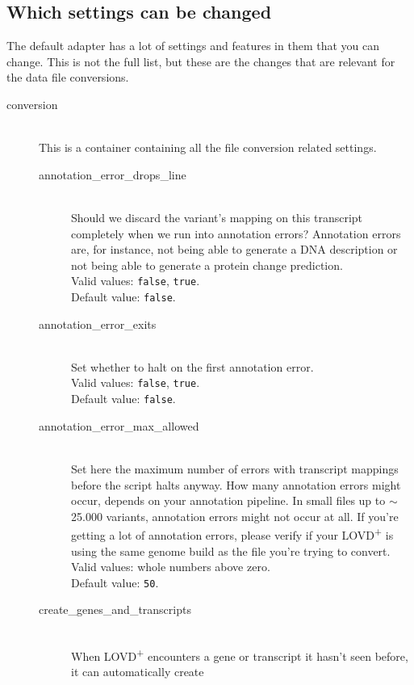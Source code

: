\subsection{Which settings can be changed}
\label{ssec:adapters_which_settings}
The default adapter has a lot of settings and features in them that you can change.
This is not the full list, but these are the changes that are relevant for the data file conversions.

\begin{description}
  \item[conversion] \hfill \\
    This is a container containing all the file conversion related settings.
  \begin{description}
    \item[annotation\_error\_drops\_line] \hfill \\
      Should we discard the variant's mapping on this transcript completely when we run into annotation errors?
      Annotation errors are, for instance, not being able to generate a DNA description or
       not being able to generate a protein change prediction.\\
      Valid values: \texttt{false}, \texttt{true}.\\
      Default value: \texttt{false}.
    \item[annotation\_error\_exits] \hfill \\
      Set whether to halt on the first annotation error.\\
      Valid values: \texttt{false}, \texttt{true}.\\
      Default value: \texttt{false}.
    \item[annotation\_error\_max\_allowed] \hfill \\
      Set here the maximum number of errors with transcript mappings before the script halts anyway.
      How many annotation errors might occur, depends on your annotation pipeline.
      In small files up to $\sim$25.000 variants, annotation errors might not occur at all.
      If you're getting a lot of annotation errors, please verify if your
       LOVD\textsuperscript{+} is using the same genome build as the file you're trying to convert.\\
      Valid values: whole numbers above zero.\\
      Default value: \texttt{50}.
    \item[create\_genes\_and\_transcripts] \hfill \\
      When LOVD\textsuperscript{+} encounters a gene or transcript it hasn't seen before, it can automatically create

\end{description}
\end{description}
